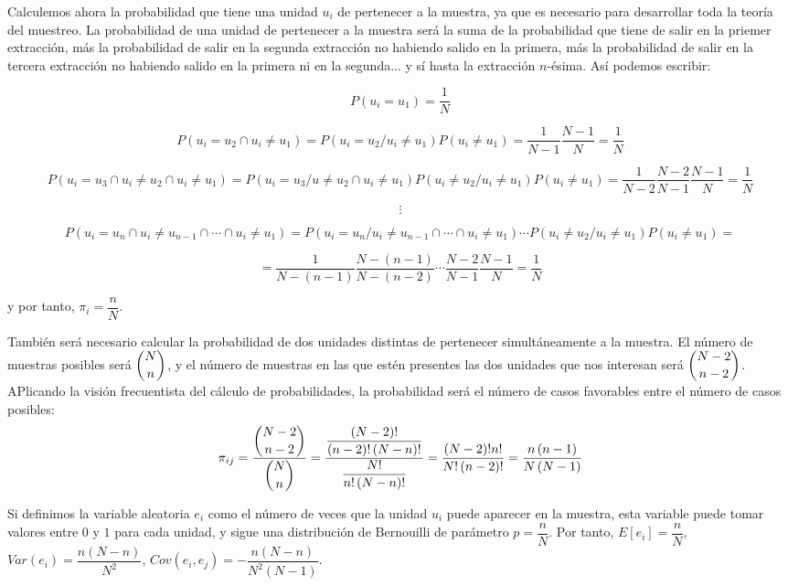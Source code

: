Calculemos ahora la probabilidad que tiene una unidad $u_{i}$ de
pertenecer a la muestra, ya que es necesario para desarrollar toda
la teor\'ia del muestreo. La probabilidad de una unidad de pertenecer
a la muestra ser\'a la suma de la probabilidad que tiene de salir en
la priemer extracci\'on, m\'as la probabilidad de salir en la segunda
extracci\'on no habiendo salido en la primera, m\'as la probabilidad de
salir en la tercera extracci\'on no habiendo salido en la primera ni
en la segunda... y s\'i hasta la extracci\'on $n$-\'esima. As\'i podemos
escribir:

\[
P\left(u_{i}=u_{1}\right)=\dfrac{1}{N}
\]


\[
P\left(u_{i}=u_{2}\cap u_{i}\neq u_{1}\right)=P\left(u_{i}=u_{2}/u_{i}\neq u_{1}\right)P\left(u_{i}\neq u_{1}\right)=\dfrac{1}{N-1}\dfrac{N-1}{N}=\dfrac{1}{N}
\]


\[
P\left(u_{i}=u_{3}\cap u_{i}\neq u_{2}\cap u_{i}\neq u_{1}\right)=P\left(u_{i}=u_{3}/u\neq u_{2}\cap u_{i}\neq u_{1}\right)P\left(u_{i}\neq u_{2}/u_{i}\neq u_{1}\right)P\left(u_{i}\neq u_{1}\right)=\dfrac{1}{N-2}\dfrac{N-2}{N-1}\dfrac{N-1}{N}=\dfrac{1}{N}
\]


\[
\vdots
\]


\[
P\left(u_{i}=u_{n}\cap u_{i}\neq u_{n-1}\cap\cdots\cap u_{i}\neq u_{1}\right)=P\left(u_{i}=u_{n}/u_{i}\neq u_{n-1}\cap\cdots\cap u_{i}\neq u_{1}\right)\cdots P\left(u_{i}\neq u_{2}/u_{i}\neq u_{1}\right)P\left(u_{i}\neq u_{1}\right)=
\]


\[
=\dfrac{1}{N-\left(n-1\right)}\dfrac{N-\left(n-1\right)}{N-\left(n-2\right)}\cdots\dfrac{N-2}{N-1}\dfrac{N-1}{N}=\dfrac{1}{N}
\]


y por tanto, $\pi_{i}=\dfrac{n}{N}$.

Tambi\'en ser\'a necesario calcular la probabilidad de dos unidades distintas
de pertenecer simult\'aneamente a la muestra. El n\'umero de muestras
posibles ser\'a $\dbinom{N}{n}$, y el n\'umero de muestras en las que
est\'en presentes las dos unidades que nos interesan ser\'a $\dbinom{N-2}{n-2}$.
APlicando la visi\'on frecuentista del c\'alculo de probabilidades, la
probabilidad ser\'a el n\'umero de casos favorables entre el n\'umero de
casos posibles: 
\[
\pi_{ij}=\dfrac{\dbinom{N-2}{n-2}}{\dbinom{N}{n}}=\dfrac{\dfrac{\left(N-2\right)!}{\left(n-2\right)!\left(N-n\right)!}}{\dfrac{N!}{n!\left(N-n\right)!}}=\dfrac{\left(N-2\right)!n!}{N!\left(n-2\right)!}=\dfrac{n\left(n-1\right)}{N\left(N-1\right)}
\]


Si definimos la variable aleatoria $e_{i}$ como el n\'umero de veces
que la unidad $u_{i}$ puede aparecer en la muestra, esta variable
puede tomar valores entre $0$ y $1$ para cada unidad, y sigue una
distribuci\'on de Bernouilli de par\'ametro $p=\dfrac{n}{N}$. Por tanto,
$E\left[e_{i}\right]=\dfrac{n}{N}$, $Var\left(e_{i}\right)=\dfrac{n\left(N-n\right)}{N^{2}}$,
$Cov\left(e_{i},e_{j}\right)=-\dfrac{n\left(N-n\right)}{N^{2}\left(N-1\right)}$.


